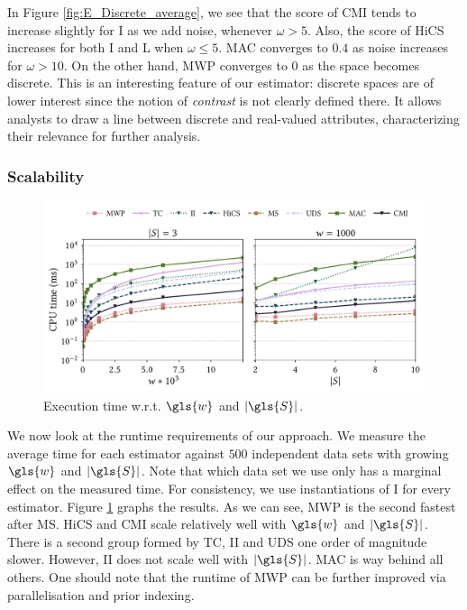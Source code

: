 In Figure \ref{fig:E_Discrete_average}, we see that the score of \gls{CMI} tends to increase slightly for I as we add noise, whenever $\omega > 5$. Also, the score of \gls{HiCS} increases for both I and L when $\omega \leq 5$. \gls{MAC} converges to $0.4$ as noise increases for $\omega > 10$. On the other hand, \gls{MWP} converges to $0$ as the space becomes discrete. This is an interesting feature of our estimator: discrete spaces are of lower interest since the notion of \textit{contrast} is not clearly defined there. It allows analysts to draw a line between discrete and real-valued attributes, characterizing their relevance for further analysis.   

\subsubsection{Scalability}
\label{sec:scalability}

\begin{figure}
	\includegraphics[width=1.0\linewidth]{part2-figures/Fig10-2_thesis-compressed.pdf} 
	\caption{Execution time w.r.t. $\gls{w}$ and $|\gls{S}|$.}
	\label{fig:Runtime_n_d}
\end{figure} 

We now look at the runtime requirements of our approach. We measure the average time for each estimator against $500$ independent data sets with growing $\gls{w}$ and $|\gls{S}|$. Note that which data set we use only has a marginal effect on the measured time. For consistency, we use instantiations of I for every estimator. 
Figure \ref{fig:Runtime_n_d} graphs the results. As we can see, \gls{MWP} is the second fastest after \gls{MS}. 
\gls{HiCS} and \gls{CMI} scale relatively well with $\gls{w}$ and $|\gls{S}|$. There is a second group formed by \gls{TC}, \gls{II} and \gls{UDS} one order of magnitude slower. However, \gls{II} does not scale well with $|\gls{S}|$. \gls{MAC} is way behind all others. One should note that the runtime of \gls{MWP} can be further improved via parallelisation and prior indexing.

